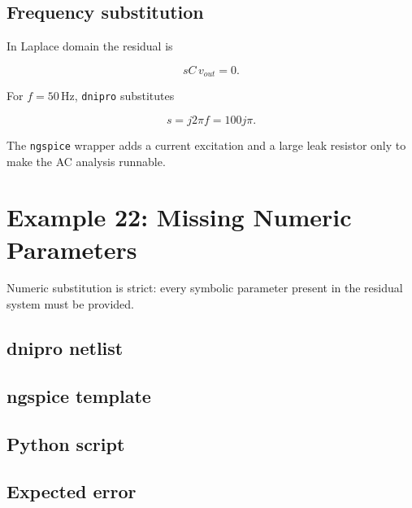 \documentclass[11pt,a4paper]{article}
\newcommand{\project}{\texttt{dnipro}}
\newcommand{\ngspice}{\texttt{ngspice}}
\begin{document}
\subsection{Frequency substitution}

In Laplace domain the residual is

\begin{equation}
    sC\,v_{out} = 0.
\end{equation}

For \(f=50\,\mathrm{Hz}\), \project{} substitutes

\begin{equation}
    s = j2\pi f = 100j\pi.
\end{equation}

The \ngspice{} wrapper adds a current excitation and a large leak resistor only
to make the AC analysis runnable.

\section{Example 22: Missing Numeric Parameters}
\label{sec:ex-missing-params}

Numeric substitution is strict: every symbolic parameter present in the residual
system must be provided.

\subsection{dnipro netlist}



\subsection{ngspice template}



\subsection{Python script}



\subsection{Expected error}
\end{document}
